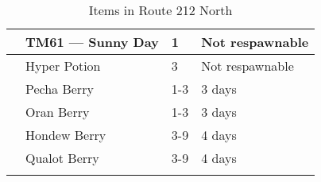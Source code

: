 \begin{longtable}{|| l l l l ||}%
\hline%
&TM61 — Sunny Day&1&Not respawnable\\%
\hline%
&Hyper Potion&3&Not respawnable\\%
\hline%
&Pecha Berry&1{-}3&3 days\\%
\hline%
&Oran Berry&1{-}3&3 days\\%
\hline%
&Hondew Berry&3{-}9&4 days\\%
\hline%
&Qualot Berry&3{-}9&4 days\\%
\hline%
\endhead%
\hline%
\caption{Items in Route 212 North}%
\label{tab:Route212NorthItems}%
\end{longtable}